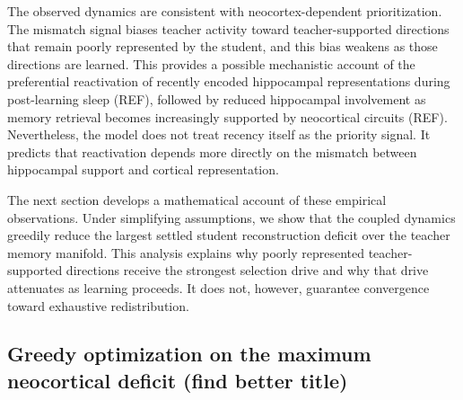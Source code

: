 \documentclass[10pt,letterpaper]{article}
\theoremstyle{plain}
\theoremstyle{remark}
\begin{document}
The observed dynamics are consistent with neocortex-dependent prioritization. The mismatch signal biases teacher activity toward teacher-supported directions that remain poorly represented by the student, and this bias weakens as those directions are learned. This provides a possible mechanistic account of the preferential reactivation of recently encoded hippocampal representations during post-learning sleep (REF), followed by reduced hippocampal involvement as memory retrieval becomes increasingly supported by neocortical circuits (REF). Nevertheless, the model does not treat recency itself as the priority signal. It predicts that reactivation depends more directly on the mismatch between hippocampal support and cortical representation.

The next section develops a mathematical account of these empirical observations. Under simplifying assumptions, we show that the coupled dynamics greedily reduce the largest settled student reconstruction deficit over the teacher memory manifold. This analysis explains why poorly represented teacher-supported directions receive the strongest selection drive and why that drive attenuates as learning proceeds. It does not, however, guarantee convergence toward exhaustive redistribution.

\newpage

\subsection{Greedy optimization on the maximum neocortical deficit (find better title)}
\end{document}
